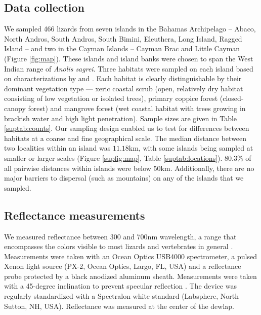 
\subsection*{Data collection}
	
We sampled 466 lizards from seven islands in the Bahamas Archipelago -- Abaco, North Andros, South Andros, South Bimini, Eleuthera, Long Island, Ragged Island -- and two in the Cayman Islands -- Cayman Brac and Little Cayman (Figure \ref{fig:map}). These islands and island banks were chosen to span the West Indian range of \textit{Anolis sagrei}. Three habitats were sampled on each island based on characterizations by \citet{Howard1950} and \citet{Schoener1968}. Each habitat is clearly distinguishable by their dominant vegetation type --- xeric coastal scrub (open, relatively dry habitat consisting of low vegetation or isolated trees), primary coppice forest (closed-canopy forest) and mangrove forest (wet coastal habitat with trees growing in brackish water and high light penetration). Sample sizes are given in Table \ref{suptab:counts}. Our sampling design enabled us to test for differences between habitats at a coarse and fine geographical scale. The median distance between two localities within an island was $11.18$km, with some islands being sampled at smaller or larger scales (Figure \ref{supfig:map}, Table \ref{suptab:locations}). $80.3$\% of all pairwise distances within islands were below $50$km. Additionally, there are no major barriers to dispersal (such as mountains) on any of the islands that we sampled.
	
\subsection*{Reflectance measurements}

We measured reflectance between 300 and 700nm wavelength, a range that encompasses the colors visible to most lizards and vertebrates in general \citep{Lazareva2012}. Measurements were taken with an Ocean Optics USB4000 spectrometer, a pulsed Xenon light source (PX-2, Ocean Optics, Largo, FL, USA) and a reflectance probe protected by a black anodized aluminum sheath. Measurements were taken with a 45-degree inclination to prevent specular reflection \citep{Endler1990}. The device was regularly standardized with a Spectralon white standard (Labsphere, North Sutton, NH, USA). Reflectance was measured at the center of the dewlap.

